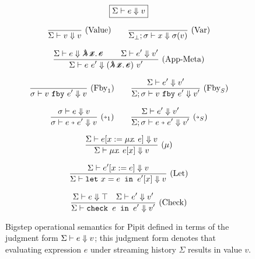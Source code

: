 \begin{figure}
  \[ \boxed{\Sigma \vdash e \Downarrow v} \]

  \[
    \enskip \frac {\displaystyle } {\displaystyle \Sigma \vdash v \Downarrow v} \  \mbox{(Value)} \enskip
    \quad
    \enskip \frac {\displaystyle } {\displaystyle \Sigma_\bot; \sigma \vdash x \Downarrow \sigma(v)} \  \mbox{(Var)} \enskip
  \]

  \[
    \ruleIN{
      \bigstep{\Sigma}{e}{\mlamX}
      \qquad
      \bigstep{\Sigma}{e'}{v'}
    }{\bigstep{\Sigma}{e~e'}{(\mlamX)~v'}}{App-Meta}
  \]


  \[
    \enskip \frac {\displaystyle } {\displaystyle \sigma \vdash v~\texttt{fby}~e' \Downarrow v} \  \mbox{($\mbox{Fby}_1$)} \enskip
    \quad
    \enskip \frac {\displaystyle \Sigma \vdash e' \Downarrow v'} {\displaystyle \Sigma; \sigma \vdash v~\texttt{fby}~e' \Downarrow v'} \  \mbox{($\mbox{Fby}_S$)} \enskip
  \]

  \[
    \ruleIN{\bigstep{\sigma}{e}{v}}{\bigstep{\sigma}{\xthen{e}{e'}}{v}}{$\xthenarrow_1$}
    \quad
    \ruleIN{\bigstep{\Sigma}{e'}{v'}}{\bigstep{\Sigma; \sigma}{\xthen{e}{e'}}{v'}}{$\xthenarrow_S$}
  \]

  \[
    \enskip \frac {\displaystyle 
      \Sigma \vdash e[x := \mu{} x \!.~e] \Downarrow v
    } {\displaystyle 
      \Sigma \vdash \mu{} x \!.~e[x] \Downarrow v
    } \  \mbox{($\mu{}$)} \enskip
  \]

  \[
    \enskip \frac {\displaystyle 
      \Sigma \vdash e'[x := e] \Downarrow v
    } {\displaystyle 
      \Sigma \vdash \texttt{let}~x = e \texttt{~in~} e'[x] \Downarrow v
    } \  \mbox{(Let)} \enskip
  \]

  \[
    \enskip \frac {\displaystyle 
      \Sigma \vdash e \Downarrow \top
      \quad
      \Sigma \vdash e' \Downarrow v'
    } {\displaystyle 
      \Sigma \vdash \texttt{check~} e \texttt{~in~} e' \Downarrow v'
    } \  \mbox{(Check)} \enskip
  \]

  \caption{Bigstep operational semantics for Pipit defined in terms of the judgment form $\Sigma \vdash e \Downarrow v$; this judgment form denotes that evaluating expression $e$ under streaming history $\Sigma$ results in value $v$.}\label{f:core-bigstep}
\end{figure}